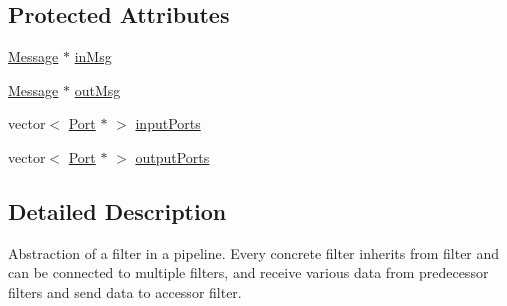 \subsection*{Protected Attributes}
\begin{DoxyCompactItemize}
\item 
\hyperlink{classMessage}{Message} $\ast$ \hyperlink{classFilter_ac938e02933af2dfb267895d260221d92}{in\-Msg}
\item 
\hyperlink{classMessage}{Message} $\ast$ \hyperlink{classFilter_a5c1d2a7a7da437769281029505ef3054}{out\-Msg}
\item 
vector$<$ \hyperlink{classPort}{Port} $\ast$ $>$ \hyperlink{classFilter_ad09f0773f4b96d6f9ac143bb5b046d0b}{input\-Ports}
\item 
vector$<$ \hyperlink{classPort}{Port} $\ast$ $>$ \hyperlink{classFilter_abf9b24a29561046ca09c65f5dde427ea}{output\-Ports}
\end{DoxyCompactItemize}


\subsection{Detailed Description}
Abstraction of a filter in a pipeline. Every concrete filter inherits from filter and can be connected to multiple filters, and receive various data from predecessor filters and send data to accessor filter. 

